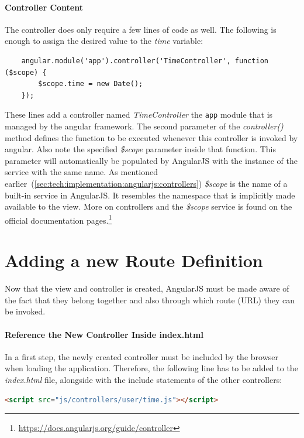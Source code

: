 \documentclass[nochapterpage,nopartpage,noheadingspace,numbersubsubsec,bigchapter,colorback,accentcolor=tud9c,10pt]{tudreport}
\begin{document}
  \paragraph{Controller Content}
    The controller does only require a few lines of code as well. The following is enough to assign the desired value to the \emph{time} variable:
        \begin{lstlisting}
    angular.module('app').controller('TimeController', function ($scope) {
        $scope.time = new Date();
    });
        \end{lstlisting}
    These lines add a controller named \emph{TimeController} the \texttt{app} module that is managed by the angular framework. The second parameter of the \emph{controller()} method defines the function to be executed whenever this controller is invoked by angular. Also note the specified \emph{\$scope} parameter inside that function. This parameter will automatically be populated by AngularJS with the instance of the service with the same name. As mentioned earlier~(\ref{sec:tech:implementation:angularjs:controllers}) \emph{\$scope} is the name of a built-in service in AngularJS. It resembles the namespace that is implicitly made available to the view. More on controllers and the \emph{\$scope} service is found on the official documentation pages.\footnote{\url{https://docs.angularjs.org/guide/controller}}

  \section{Adding a new Route Definition}
  \label{sec:tech:handson:add-route}

    Now that the view and controller is created, AngularJS must be made aware of the fact that they belong together and also through which route (URL) they can be invoked.

  \paragraph{Reference the New Controller Inside index.html}
    In a first step, the newly created controller must be included by the browser when loading the application. Therefore, the following line has to be added to the \emph{index.html} file, alongside with the include statements of the other controllers:
        \begin{lstlisting}[language=html]
    <script src="js/controllers/user/time.js"></script>
        \end{lstlisting}
\end{document}
